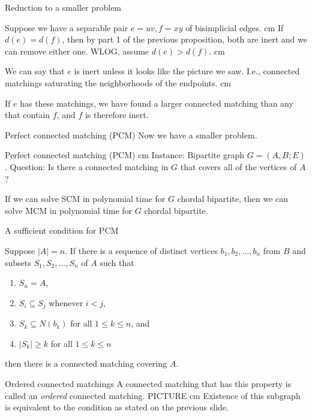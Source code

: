 \documentclass{beamer}
\newcommand{\bframe}[2]{\begin{frame}{#1}#2\end{frame}}
\begin{document}
\bframe{Reduction to a smaller problem}{

Suppose we have a separable pair $e = uv, f = xy$ of bisimplicial edges.\pause\vskip 0.5 cm
If $d(e) = d(f)$, then by part 1 of the previous proposition, both are inert and we can remove either one. \pause WLOG, assume $d(e) > d(f)$.  \pause \vskip 0.5 cm

We can say that $e$ is inert unless it looks like the picture we saw.  \pause I.e., connected matchings saturating the neighborhoods of the endpoints. \pause \vskip 0.5 cm

If $e$ has these matchings, we have found a larger connected matching than any that contain $f$, and $f$ is therefore inert.
}

\bframe{Perfect connected matching (PCM)}{
Now we have a smaller problem. \pause
\begin{framed}
  		Perfect connected matching (PCM)
  		\vskip 0.25 cm Instance: Bipartite graph $G = (A, B;E)$.
  		\newline Question: Is there a connected matching in $G$ that covers all of the vertices of $A$?
 	\end{framed}\pause

If we can solve SCM in polynomial time for $G$ chordal bipartite, then we can solve MCM in polynomial time for $G$ chordal bipartite.
}

\bframe{A sufficient condition for PCM}{
 
Suppose $|A| =n$.  \pause If there is a sequence of distinct vertices $b_1, b_2, \ldots, b_n$ from $B$ and subsets $S_1, S_2, \ldots ,S_n$ of $A$ such that\pause
	\begin{enumerate} 
		\item $S_n = A$, \pause
		\item $S_i \subseteq S_j$ whenever $i < j$, \pause
		\item $S_k \subseteq N(b_k)$ for all $1 \leq k \leq n$, and\pause
		\item $|S_k| \geq k$ for all $1 \leq k \leq n$\pause
	\end{enumerate}
then there is a connected matching covering $A$.
}

\bframe{Ordered connected matchings}{
A connected matching that has this property is called an {\it ordered } connected matching. PICTURE\pause\vskip 0.5 cm
Existence of this subgraph is equivalent to the condition as stated on the previous slide.
}
\end{document}
